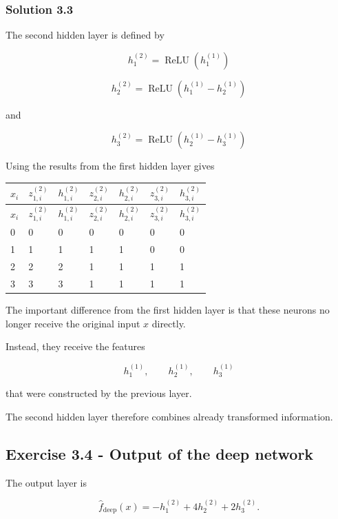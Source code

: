 \documentclass[10pt]{article}
\begin{document}
\begingroup\color{red}

\subsubsection*{Solution 3.3}
The second hidden layer is defined by

\[
h^{(2)}_1=\operatorname{ReLU}\left(h^{(1)}_1\right)
\]

\[
h^{(2)}_2=\operatorname{ReLU}\left(h^{(1)}_1-h^{(1)}_2\right)
\]

and

\[
h^{(2)}_3=\operatorname{ReLU}\left(h^{(1)}_2-h^{(1)}_3\right)
\]

Using the results from the first hidden layer gives

\begingroup
\small
\setlength{\tabcolsep}{4pt}
\begin{longtable}{l|l|l|l|l|l|l}
$x_i$ & $z^{(2)}_{1,i}$ & $h^{(2)}_{1,i}$ & $z^{(2)}_{2,i}$ & $h^{(2)}_{2,i}$ & $z^{(2)}_{3,i}$ & $h^{(2)}_{3,i}$ \\[1.5pt]
\hline
\endfirsthead
$x_i$ & $z^{(2)}_{1,i}$ & $h^{(2)}_{1,i}$ & $z^{(2)}_{2,i}$ & $h^{(2)}_{2,i}$ & $z^{(2)}_{3,i}$ & $h^{(2)}_{3,i}$ \\[1.5pt]
\hline
\endhead
0 & 0 & 0 & 0 & 0 & 0 & 0 \\[1.5pt]
1 & 1 & 1 & 1 & 1 & 0 & 0 \\[1.5pt]
2 & 2 & 2 & 1 & 1 & 1 & 1 \\[1.5pt]
3 & 3 & 3 & 1 & 1 & 1 & 1 \\[1.5pt]
\end{longtable}
\endgroup
The important difference from the first hidden layer is that these neurons no longer receive the original input $x$ directly.

Instead, they receive the features

\[
h^{(1)}_1,\qquad h^{(1)}_2,\qquad h^{(1)}_3
\]

that were constructed by the previous layer.

The second hidden layer therefore combines already transformed information.

\par\endgroup

\subsection*{Exercise 3.4 - Output of the deep network}
The output layer is

\[
\hat f_{\mathrm{deep}}(x)=-h^{(2)}_1+4h^{(2)}_2+2h^{(2)}_3.
\]
\end{document}

